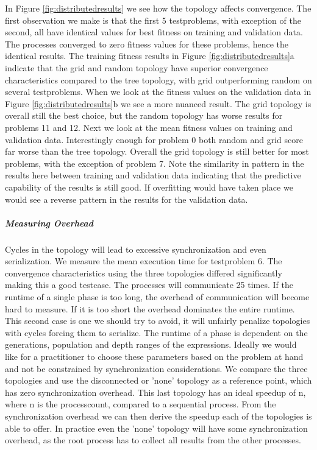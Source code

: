 In Figure \ref{fig:distributedresults} we see how the topology affects convergence. The first observation we make is that the first 5 testproblems, with exception of the second, all have identical values for best fitness on training and validation data. The processes converged to zero fitness values for these problems, hence the identical results. The training fitness results in Figure \ref{fig:distributedresults}a indicate that the grid and random topology have superior convergence characteristics compared to the tree topology, with grid outperforming random on several testproblems. When we look at the fitness values on the validation data in Figure \ref{fig:distributedresults}b we see a more nuanced result. The grid topology is overall still the best choice, but the random topology has worse results for problems 11 and 12. Next we look at the mean fitness values on training and validation data. Interestingly enough for problem 0 both random and grid score far worse than the tree topology. Overall the grid topology is still better for most problems, with the exception of problem 7. Note the similarity in pattern in the results here between training and validation data indicating that the predictive capability of the results is still good. If overfitting would have taken place we would see a reverse pattern in the results for the validation data.
\subparagraph{Measuring Overhead}
Cycles in the topology will lead to excessive synchronization and even serialization. We measure the mean execution time for testproblem 6. The convergence characteristics using the three topologies differed significantly making this a good testcase. The processes will communicate 25 times. If the runtime of a single phase is too long, the overhead of communication will become hard to measure. If it is too short the overhead dominates the entire runtime. This second case is one we should try to avoid, it will unfairly penalize topologies with cycles forcing them to serialize. The runtime of a phase is dependent on the generations, population and depth ranges of the expressions. Ideally we would like for a practitioner to choose these parameters based on the problem at hand and not be constrained by synchronization considerations. We compare the three topologies and use the disconnected or 'none' topology as a reference point, which has zero synchronization overhead. This last topology has an ideal speedup of n, where n is the processcount, compared to a sequential process. From the synchronization overhead we can then derive the speedup each of the topologies is able to offer. In practice even the 'none' topology will have some synchronization overhead, as the root process has to collect all results from the other processes.
